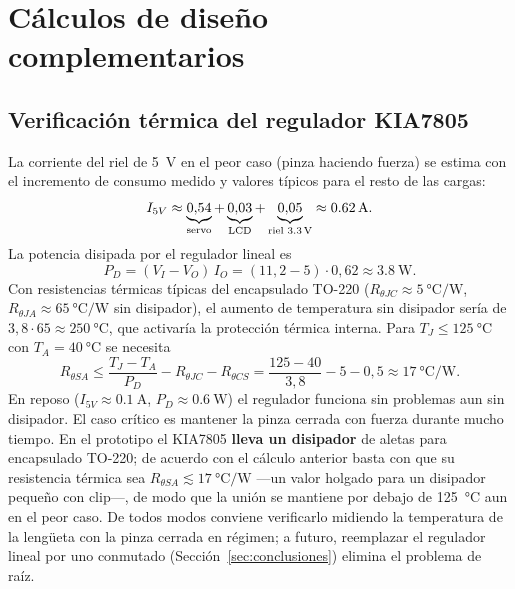 \section{Cálculos de diseño complementarios}\label{anx:calculos}

\subsection{Verificación térmica del regulador KIA7805}
La corriente del riel de \SI{5}{\volt} en el peor caso (pinza haciendo fuerza) se estima con
el incremento de consumo medido y valores típicos para el resto de las cargas:
\begin{equation}
  I_{5V} \approx \underbrace{0{,}54}_{\text{servo}} + \underbrace{0{,}03}_{\text{LCD}} + \underbrace{0{,}05}_{\text{riel \SI{3,3}{\volt}}} \approx \SI{0,62}{\ampere}.
\end{equation}
La potencia disipada por el regulador lineal es
\begin{equation}
  P_D = (V_I - V_O)\,I_O = (11{,}2 - 5)\cdot 0{,}62 \approx \SI{3,8}{\watt}.
\end{equation}
Con resistencias térmicas típicas del encapsulado TO-220 ($R_{\theta JC}\approx\SI{5}{\celsius\per\watt}$,
$R_{\theta JA}\approx\SI{65}{\celsius\per\watt}$ sin disipador), el aumento de temperatura sin disipador
sería de $3{,}8\cdot 65\approx\SI{250}{\celsius}$, que activaría la protección térmica
interna. Para $T_J\le\SI{125}{\celsius}$ con $T_A=\SI{40}{\celsius}$ se necesita
\begin{equation}
  R_{\theta SA} \le \frac{T_J - T_A}{P_D} - R_{\theta JC} - R_{\theta CS}
  = \frac{125-40}{3{,}8} - 5 - 0{,}5 \approx \SI{17}{\celsius\per\watt}.
\end{equation}
En reposo ($I_{5V}\approx\SI{0,1}{\ampere}$, $P_D\approx\SI{0,6}{\watt}$) el regulador funciona
sin problemas aun sin disipador. El caso crítico es mantener la pinza cerrada con fuerza
durante mucho tiempo. En el prototipo el KIA7805 \textbf{lleva un disipador} de aletas para
encapsulado TO-220; de acuerdo con el cálculo anterior basta con que su resistencia térmica sea
$R_{\theta SA}\lesssim\SI{17}{\celsius\per\watt}$ —un valor holgado para un disipador pequeño con
clip—, de modo que la unión se mantiene por debajo de \SI{125}{\celsius} aun en el peor caso.
De todos modos conviene verificarlo midiendo la temperatura de la lengüeta con la pinza cerrada
en régimen; a futuro, reemplazar el regulador lineal por uno conmutado (Sección~\ref{sec:conclusiones})
elimina el problema de raíz.

